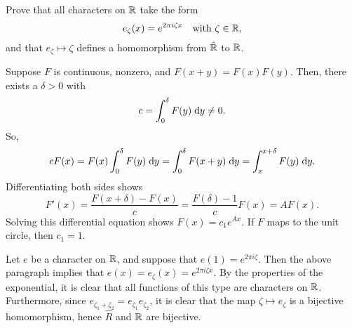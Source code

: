 \begin{exrc}[6]
    Prove that all characters on \(\mathbb{R}\) take the form
    \begin{equation*}
        e_{\zeta}(x) = e^{2\pi i \zeta x} \quad \text{with \(\zeta \in \mathbb{R}\)},
    \end{equation*}
    and that \(e_{\zeta} \mapsto \zeta\) defines a homomorphism from \(\hat{\mathbb{R}}\) to \(\mathbb{R}\).


\begin{soln}
    Suppose \(F\) is continuous, nonzero, and \(F(x + y) = F(x)F(y)\).
    Then, there exists a \(\delta > 0\) with
    \begin{equation*}
        c = \int_{0}^{\delta} F(y) \;\mathrm d y \neq 0.
    \end{equation*}
    So,
    \begin{equation*}
        c F(x) = F(x) \int_{0}^{\delta} F(y) \;\mathrm d y
        = \int_{0}^{\delta} F(x + y) \;\mathrm d y
        = \int_{x}^{x + \delta} F(y) \;\mathrm d y.
    \end{equation*}
    Differentiating both sides shows
    \begin{equation*}
        F'(x) = \frac{F(x + \delta) - F(x)}{c} = \frac{F(\delta) - 1}{c} F(x)
        = A F(x).
    \end{equation*}
    Solving this differential equation shows \(F(x) = c_1 e^{Ax}\).
    If \(F\) maps to the unit circle, then \(c_1 = 1\).

    Let \(e\) be a character on \(\mathbb{R}\), and suppose that \(e(1) = e^{2 \pi i \zeta}\).
    Then the above paragraph implies that \(e(x) = e_\zeta(x) = e^{2 \pi i \zeta x}\).
    By the properties of the exponential, it is clear that all
    functions of this type are characters on \(\mathbb{R}\).
    Furthermore, since \(e_{\zeta_1 + \zeta_2} = e_{\zeta_1} e_{\zeta_2}\),
    it is clear that the map \(\zeta \mapsto e_{\zeta}\) is a bijective homomorphism,
    hence \(\hat{R}\) and \(\mathbb{R}\) are bijective.


\end{soln}
\end{exrc}
